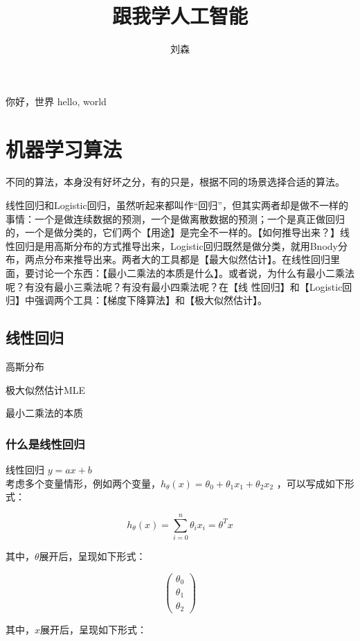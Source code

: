 \documentclass[UTF8]{ctexart}
\author{刘森}
\title{跟我学人工智能}
\begin{document}
    \maketitle
你好，世界 hello, world %

\section{机器学习算法}

不同的算法，本身没有好坏之分，有的只是，根据不同的场景选择合适的算法。

线性回归和Logistic回归，虽然听起来都叫作“回归”，但其实两者却是做不一样的事情：一个是做连续数据的预测，一个是做离散数据的预测；一个是真正做回归的，一个是做分类的，它们两个【用途】是完全不一样的。【如何推导出来？】线性回归是用高斯分布的方式推导出来，Logistic回归既然是做分类，就用Bnody分布，两点分布来推导出来。两者大的工具都是【最大似然估计】。在线性回归里面，要讨论一个东西：【最小二乘法的本质是什么】。或者说，为什么有最小二乘法呢？有没有最小三乘法呢？有没有最小四乘法呢？在【线 性回归】和【Logistic回归】中强调两个工具：【梯度下降算法】和【极大似然估计】。

\subsection{线性回归}
高斯分布

极大似然估计MLE

最小二乘法的本质

\subsubsection{什么是线性回归}
线性回归
$y=ax+b$\\

考虑多个变量情形，例如两个变量，$h_{\theta}(x)=\theta_{0}+\theta_{1}x_{1}+\theta_{2}x_{2}$ ，可以写成如下形式：

\begin{displaymath}
h_{\theta}(x)=\sum_{i=0}^{n}\theta_{i}x_{i}=\theta^{T}x
\end{displaymath}

其中，$\theta$展开后，呈现如下形式：

\[ \left( \begin{array}{c}
\theta_{0} \\
\theta_{1} \\
\theta_{2} \end{array} \right)\]

其中，$x$展开后，呈现如下形式：
\end{document}
